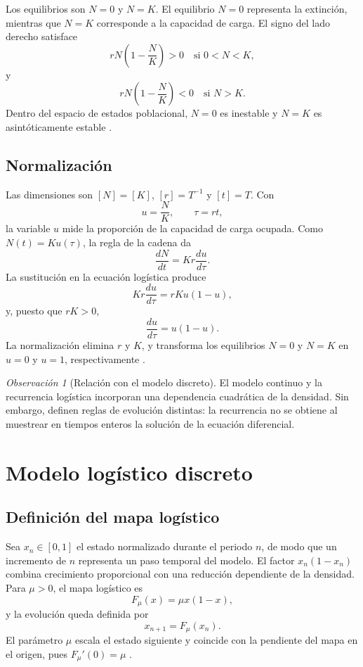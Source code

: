 \documentclass[11pt,letterpaper]{article}
\theoremstyle{definition}
\theoremstyle{remark}
\newtheorem{observacion}[teorema]{Observación}
\begin{document}
Los equilibrios son \(N=0\) y \(N=K\). El equilibrio \(N=0\) representa la extinción, mientras que \(N=K\) corresponde a la capacidad de carga. El signo del lado derecho satisface
\[
rN\left(1-\frac{N}{K}\right)>0
\quad\text{si }0<N<K,
\]
y
\[
rN\left(1-\frac{N}{K}\right)<0
\quad\text{si }N>K.
\]
Dentro del espacio de estados poblacional, \(N=0\) es inestable y \(N=K\) es asintóticamente estable \cite{ApuntesMM1_2026}.

\subsection{Normalización}

Las dimensiones son \([N]=[K]\), \([r]=T^{-1}\) y \([t]=T\). Con
\[
u=\frac{N}{K},
\qquad
\tau=rt,
\]
la variable \(u\) mide la proporción de la capacidad de carga ocupada. Como \(N(t)=Ku(\tau)\), la regla de la cadena da
\[
\frac{dN}{dt}=Kr\frac{du}{d\tau}.
\]
La sustitución en la ecuación logística produce
\[
Kr\frac{du}{d\tau}=rKu(1-u),
\]
y, puesto que \(rK>0\),
\[
\frac{du}{d\tau}=u(1-u).
\]
La normalización elimina \(r\) y \(K\), y transforma los equilibrios \(N=0\) y \(N=K\) en \(u=0\) y \(u=1\), respectivamente \cite{ApuntesMM1_2026}.

\begin{observacion}[Relación con el modelo discreto]
El modelo continuo y la recurrencia logística incorporan una dependencia cuadrática de la densidad. Sin embargo, definen reglas de evolución distintas: la recurrencia no se obtiene al muestrear en tiempos enteros la solución de la ecuación diferencial.
\end{observacion}

\section{Modelo logístico discreto}
\label{sec:logistico-discreto}

\subsection{Definición del mapa logístico}

Sea \(x_n\in[0,1]\) el estado normalizado durante el periodo \(n\), de modo que un incremento de \(n\) representa un paso temporal del modelo. El factor \(x_n(1-x_n)\) combina crecimiento proporcional con una reducción dependiente de la densidad. Para \(\mu>0\), el mapa logístico es
\[
F_\mu(x)=\mu x(1-x),
\]
y la evolución queda definida por
\[
x_{n+1}=F_\mu(x_n).
\]
El parámetro \(\mu\) escala el estado siguiente y coincide con la pendiente del mapa en el origen, pues \(F_\mu'(0)=\mu\) \cite{HirschSmaleDevaney2013}.
\end{document}
